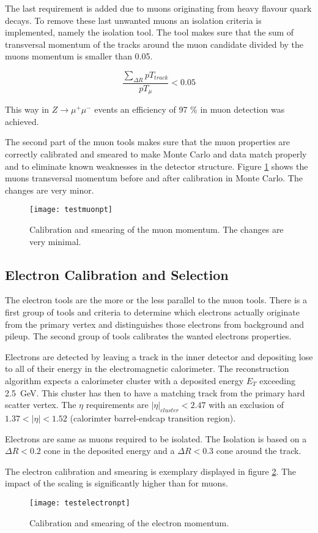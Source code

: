 The last requirement is added due to muons originating from heavy flavour quark decays.
To remove these last unwanted muons an isolation criteria is implemented, namely the isolation tool. The tool makes sure that the sum of transversal momentum of the tracks around the muon candidate divided by the muons momentum is smaller than \num{0.05}. 

\begin{equation}
\frac{\sum_{\Delta R}pT_{track}}{pT_{\mu}} < 0.05
\end{equation}

This way in $Z \rightarrow \mu^+ \mu^-$ events an efficiency of \num{97} \% in muon detection was achieved.

The second part of the muon tools makes sure that the muon properties are correctly calibrated and smeared to make Monte Carlo and data match properly and to eliminate known weaknesses in the detector structure. Figure \ref{fig:testmuonpt} shows the muons transversal momentum before and after calibration in Monte Carlo. The changes are very minor.

\begin{figure}[h]
\centering
\texttt{[image: testmuonpt]}
\caption{Calibration and smearing of the muon momentum. The changes are very minimal.}
\label{fig:testmuonpt}
\end{figure}

\subsection{Electron Calibration and Selection}

The electron tools are the more or the less parallel to the muon tools. There is a first group of tools and criteria to determine which electrons actually originate from the primary vertex and distinguishes those electrons from background and pileup. The second group of tools calibrates the wanted electrons properties.

Electrons are detected by leaving a track in the inner detector and depositing lose to all of their energy in the electromagnetic calorimeter. The reconstruction algorithm expects a calorimeter cluster with a deposited energy $E_T$ exceeding \SI{2.5}{\GeV}. This cluster has then to have a matching track from the primary hard scatter vertex. The $\eta$ requirements are $|\eta|_{cluster} < 2.47$ with an exclusion of $\num{1.37} < |\eta| < \num{1.52}$ (calorimter barrel-endcap transition region).

Electrons are same as muons required to be isolated. The Isolation is based on a $\Delta R < \num{0.2}$ cone in the deposited energy and a $\Delta R < \num{0.3}$ cone around the track.

The electron calibration and smearing is exemplary displayed in figure \ref{fig:testelectronpt}. The impact of the scaling is significantly higher than for muons.

\begin{figure}
\centering
\texttt{[image: testelectronpt]}
\caption{Calibration and smearing of the electron momentum.}
\label{fig:testelectronpt}
\end{figure}